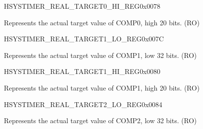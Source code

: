 \begin{register}{H}{SYSTIMER\_REAL\_TARGET0\_HI\_REG}{0x0078}\label{regdesc:SYSTIMERREALTARGET0HIREG}
%
%
\regnewline%
\begin{regdesc}\begin{reglist}
\label{fielddesc:SYSTIMERTARGET0HIRO}\item [SYSTIMER\_TARGET0\_HI\_RO] Represents the actual target value of COMP0, high 20 bits. (RO)
\end{reglist}\end{regdesc}
\end{register}


\begin{register}{H}{SYSTIMER\_REAL\_TARGET1\_LO\_REG}{0x007C}\label{regdesc:SYSTIMERREALTARGET1LOREG}
%
\regnewline%
\begin{regdesc}\begin{reglist}
\label{fielddesc:SYSTIMERTARGET1LORO}\item [SYSTIMER\_TARGET1\_LO\_RO] Represents the actual target value of COMP1, low 32 bits. (RO)
\end{reglist}\end{regdesc}
\end{register}


\begin{register}{H}{SYSTIMER\_REAL\_TARGET1\_HI\_REG}{0x0080}\label{regdesc:SYSTIMERREALTARGET1HIREG}
%
%
\regnewline%
\begin{regdesc}\begin{reglist}
\label{fielddesc:SYSTIMERTARGET1HIRO}\item [SYSTIMER\_TARGET1\_HI\_RO] Represents the actual target value of COMP1, high 20 bits. (RO)
\end{reglist}\end{regdesc}
\end{register}


\begin{register}{H}{SYSTIMER\_REAL\_TARGET2\_LO\_REG}{0x0084}\label{regdesc:SYSTIMERREALTARGET2LOREG}
%
\regnewline%
\begin{regdesc}\begin{reglist}
\label{fielddesc:SYSTIMERTARGET2LORO}\item [SYSTIMER\_TARGET2\_LO\_RO] Represents the actual target value of COMP2, low 32 bits. (RO)
\end{reglist}\end{regdesc}
\end{register}


